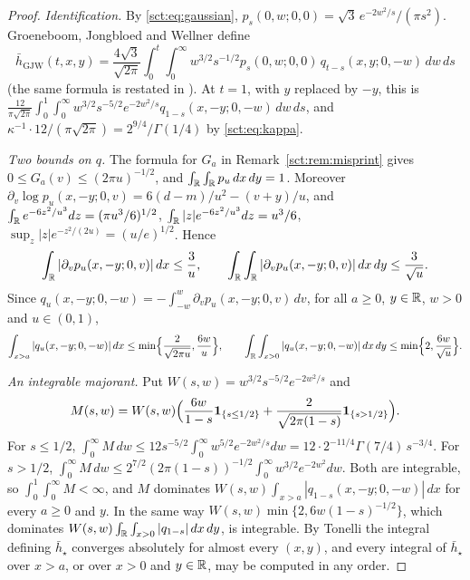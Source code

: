 \documentclass[11pt,letterpaper]{article}
\theoremstyle{definition}\newtheorem{remark}[theorem]{Remark}
\newcommand{\ind}{\mathbf 1}\newcommand{\Vdw}{V_{\mathrm{DW}}}
\newcommand{\hstar}{\bar h_\star}\newcommand{\fstar}{f_\star}\newcommand{\Kstar}{K_\star}
\begin{document}
\begin{proof}
\emph{Identification.} By \eqref{sct:eq:gaussian}, $p_s(0,w;0,0)=\sqrt3\,e^{-2w^2/s}/(\pi s^2)$. Groeneboom, Jongbloed and Wellner define
\[
 \bar h_{\mathrm{GJW}}(t,x,y)=\frac{4\sqrt3}{\sqrt{2\pi}}\int_0^t\int_0^\infty
 w^{3/2}s^{-1/2}p_s(0,w;0,0)\,q_{t-s}(x,y;0,-w)\,dw\,ds
\]
\cite[(2.24)]{gjw} (the same formula is restated in \cite[Section~6]{bdw}). At $t=1$, with $y$ replaced by $-y$, this is $\frac{12}{\pi\sqrt{2\pi}}\int_0^1\int_0^\infty w^{3/2}s^{-5/2}e^{-2w^2/s}q_{1-s}(x,-y;0,-w)\,dw\,ds$, and $\kappa^{-1}\cdot12/(\pi\sqrt{2\pi})=2^{9/4}/\Gamma(1/4)$ by \eqref{sct:eq:kappa}.

\emph{Two bounds on $q$.} The formula for $G_a$ in Remark~\ref{sct:rem:misprint} gives $0\le G_a(v)\le(2\pi u)^{-1/2}$, and $\int_\mathbb R\int_\mathbb R p_u\,dx\,dy=1$. Moreover $\partial_v\log p_u(x,-y;0,v)=6(d-m)/u^2-(v+y)/u$, and $\int_\mathbb R e^{-6z^2/u^3}dz=(\pi u^3/6)^{1/2}$, $\int_\mathbb R|z|e^{-6z^2/u^3}dz=u^3/6$, $\sup_z|z|e^{-z^2/(2u)}=(u/e)^{1/2}$. Hence
\[
 \int_\mathbb R|\partial_vp_u(x,-y;0,v)|\,dx\le\frac{3}{u},\qquad
 \int_\mathbb R\int_\mathbb R|\partial_vp_u(x,-y;0,v)|\,dx\,dy\le\frac{3}{\sqrt u}.
\]
Since $q_u(x,-y;0,-w)=-\int_{-w}^{w}\partial_vp_u(x,-y;0,v)\,dv$, for all $a\ge0$, $y\in\mathbb R$, $w>0$ and $u\in(0,1)$,
\[
 \int_{x>a}|q_u(x,-y;0,-w)|\,dx\le\min\Bigl\{\frac{2}{\sqrt{2\pi u}},\frac{6w}{u}\Bigr\},\qquad
 \int_\mathbb R\int_{x>0}|q_u(x,-y;0,-w)|\,dx\,dy\le\min\Bigl\{2,\frac{6w}{\sqrt u}\Bigr\}.
\]

\emph{An integrable majorant.} Put $W(s,w)=w^{3/2}s^{-5/2}e^{-2w^2/s}$ and
\[
 M(s,w)=W(s,w)\Bigl(\frac{6w}{1-s}\ind_{\{s\le1/2\}}+\frac{2}{\sqrt{2\pi(1-s)}}\ind_{\{s>1/2\}}\Bigr).
\]
For $s\le1/2$, $\int_0^\infty M\,dw\le12s^{-5/2}\int_0^\infty w^{5/2}e^{-2w^2/s}dw=12\cdot2^{-11/4}\Gamma(7/4)\,s^{-3/4}$. For $s>1/2$, $\int_0^\infty M\,dw\le2^{7/2}(2\pi(1-s))^{-1/2}\int_0^\infty w^{3/2}e^{-2w^2}dw$. Both are integrable, so $\int_0^1\int_0^\infty M<\infty$, and $M$ dominates $W(s,w)\int_{x>a}|q_{1-s}(x,-y;0,-w)|\,dx$ for every $a\ge0$ and $y$. In the same way $W(s,w)\min\{2,6w(1-s)^{-1/2}\}$, which dominates $W(s,w)\int_\mathbb R\int_{x>0}|q_{1-s}|\,dx\,dy$, is integrable. By Tonelli the integral defining $\hstar$ converges absolutely for almost every $(x,y)$, and every integral of $\hstar$ over $x>a$, or over $x>0$ and $y\in\mathbb R$, may be computed in any order.


\end{proof}
\end{document}
